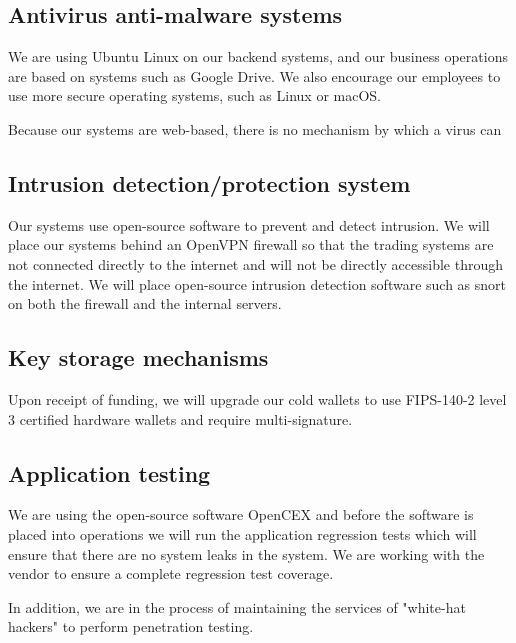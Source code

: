 \subsection{Antivirus anti-malware systems}

We are using Ubuntu Linux on our backend systems, and our business
operations are based on systems such as Google Drive.  We also
encourage our employees to use more secure operating systems, such as
Linux or macOS.

Because our systems are web-based, there is no mechanism by which a
virus can 

\subsection{Intrusion detection/protection system}

Our systems use open-source software to prevent and detect intrusion.
We will place our systems behind an OpenVPN firewall so that the
trading systems are not connected directly to the internet and will
not be directly accessible through the internet.  We will place open-source intrusion detection software such as snort on both the firewall
and the internal servers.

\subsection{Key storage mechanisms}
Upon receipt of funding, we will upgrade our cold wallets to use
FIPS-140-2 level 3 certified hardware wallets and require
multi-signature.


\subsection{Application testing}
We are using the open-source software OpenCEX and before the software is
placed into operations we will run the application regression tests
which will ensure that there are no system leaks in the system.  We
are working with the vendor to ensure a complete regression test
coverage.

In addition, we are in the process of maintaining the services of
"white-hat hackers" to perform penetration testing.

